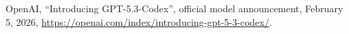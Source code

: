 OpenAI,
``Introducing GPT-5.3-Codex'', official model announcement,
February 5, 2026,
\url{https://openai.com/index/introducing-gpt-5-3-codex/}.
